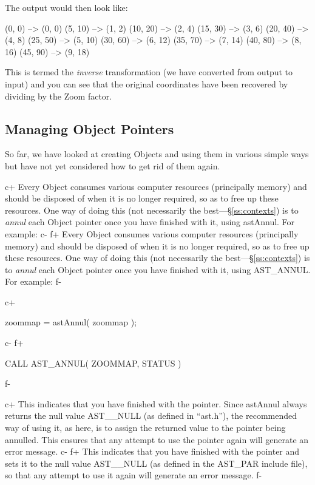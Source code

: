 \documentclass[twoside,11pt]{starlink}
\providecommand{\secref}[1]{\S\ref{#1}}
\begin{document}
The output would then look like:

\small
\begin{terminalv}
(0, 0) --> (0, 0)
(5, 10) --> (1, 2)
(10, 20) --> (2, 4)
(15, 30) --> (3, 6)
(20, 40) --> (4, 8)
(25, 50) --> (5, 10)
(30, 60) --> (6, 12)
(35, 70) --> (7, 14)
(40, 80) --> (8, 16)
(45, 90) --> (9, 18)
\end{terminalv}
\normalsize

This is termed the \emph{inverse} transformation (we have converted
from output to input) and you can see that the original coordinates
have been recovered by dividing by the Zoom factor.

\subsection{\label{ss:annullingpointers}Managing Object Pointers}

So far, we have looked at creating Objects and using them in various
simple ways but have not yet considered how to get rid of them again.

c+
Every Object consumes various computer resources (principally memory)
and should be disposed of when it is no longer required, so as to free
up these resources. One way of doing this (not necessarily the
best---\secref{ss:contexts}) is to \emph{annul} each Object pointer once
you have finished with it, using astAnnul. For example:
c-
f+
Every Object consumes various computer resources (principally memory)
and should be disposed of when it is no longer required, so as to free
up these resources. One way of doing this (not necessarily the
best---\secref{ss:contexts}) is to \emph{annul} each Object pointer once
you have finished with it, using AST\_ANNUL. For example:
f-

c+
\small
\begin{terminalv}
zoommap = astAnnul( zoommap );
\end{terminalv}
\normalsize
c-
f+
\small
\begin{terminalv}
      CALL AST_ANNUL( ZOOMMAP, STATUS )
\end{terminalv}
\normalsize
f-

c+
This indicates that you have finished with the pointer. Since astAnnul
always returns the null value AST\_\_NULL (as defined in ``ast.h''),
the recommended way of using it, as here, is to assign the returned
value to the pointer being annulled. This ensures that any attempt to
use the pointer again will generate an error message.
c-
f+
This indicates that you have finished with the pointer and sets it to
the null value AST\_\_NULL (as defined in the AST\_PAR include file),
so that any attempt to use it again will generate an error message.
f-
\end{document}
